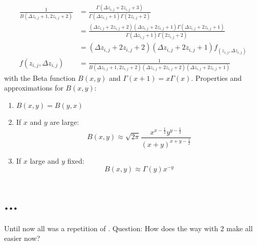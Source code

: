 \begin{equation}\begin{split}
	\frac{1}{B\left(\Delta z_{i,j} + 1, 2z_{i,j} + 2\right)} & = \frac{\Gamma\left(\Delta z_{i,j} + 2z_{i,j} + 3\right)}{\Gamma\left(\Delta z_{i,j} + 1\right)\Gamma\left(2z_{i,j} + 2\right)} \\
	& = \frac{\left(\Delta z_{i,j} + 2z_{i,j} + 2\right)\left(\Delta z_{i,j} + 2z_{i,j} + 1\right) \Gamma\left(\Delta z_{i,j} + 2z_{i,j} + 1\right)}{\Gamma\left(\Delta z_{i,j} + 1\right)\Gamma\left(2z_{i,j} + 2\right)} \\
	& = \left(\Delta z_{i,j} + 2z_{i,j} + 2\right)\left(\Delta z_{i,j} + 2z_{i,j} + 1\right) f_{\left(z_{i,j}, \Delta z_{i,j}\right)} \\
	f\left(z_{i,j}, \Delta z_{i,j}\right) & = \frac{1}{B\left(\Delta z_{i,j} + 1, 2z_{i,j} + 2\right)\left(\Delta z_{i,j} + 2z_{i,j} + 2\right)\left(\Delta z_{i,j} + 2z_{i,j} + 1\right)}
\end{split}\label{eq:gammafunczsolV1}\end{equation} 
with the Beta function $B\left(x,y\right)$ and $\Gamma\left(x+1\right) = x\Gamma\left(x\right)$. Properties and approximations for $B\left(x,y\right)$:
\begin{enumerate}
	\item $B\left(x,y\right) = B\left(y,x\right)$
	\item If $x$ and $y$ are large:
		\[ B(x,y) \approx \sqrt{2\pi} \frac{x^{x - \frac{1}{2}}y^{y - \frac{1}{2}}}{\left(x + y\right)^{x + y - \frac{1}{2}}} \]
	\item If $x$ large and $y$ fixed:
		\[ B(x,y) \approx \Gamma\left(y\right) x^{-y} \]
\label{en:propBetafunction}\end{enumerate}





\section{...}
\label{s:...}
Until now all was a repetition of \cite{2014arXiv1411.2824Z}. Question: How does the way with $2$ make all easier now?





\nocite{*}
\newpage
%



